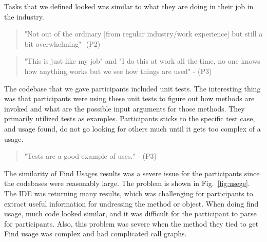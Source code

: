 \documentclass[conference]{IEEEtran}
\begin{document}
Tasks that we defined looked was similar to what they are doing in their job in the industry. 
\begin{quote}
"Not out of the ordinary [from regular industry/work experience] but still a bit overwhelming"- (P2)
\end{quote}
\begin{quote} "This is just like my job" and "I do this at work all the time, no one knows how anything works but we see how things are used"
- (P3)
\end{quote}
The codebase that we gave participants included unit tests. The interesting thing was that participants were using these unit tests to figure out how methods are invoked and what are the possible input arguments for those methods. They primarily utilized tests as examples. Participants sticks to the specific test case, and usage found, do not go looking for others much until it gets too complex of a usage.

\begin{quote} "Tests are a good example of uses." - (P3)\end{quote}

The similarity of Find Usages results was a severe issue for the participants since the codebases were reasonably large. The problem is shown in Fig.~\ref{fig:usege}. The IDE was returning many results, which was challenging for participants to extract useful information for undressing the method or object. When doing find usage, much code looked similar, and it was difficult for the participant to parse for participants. Also, this problem was severe when the method they tied to get Find usage was complex and had complicated call graphs.
\end{document}
